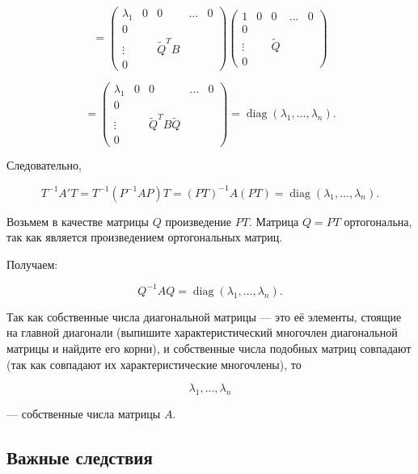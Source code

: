 {\[
= \begin{pmatrix}
\lambda_1 & 0 & 0 & \dots & 0 \\
0 & \\
\vdots & & \tilde{Q}^T B \\
0 &
\end{pmatrix}
\begin{pmatrix}
1 & 0 & 0 & \dots & 0 \\
0 & \\
\vdots & & \tilde{Q} \\
0 &
\end{pmatrix}
\]





\[
= \begin{pmatrix}
\lambda_1 & 0 & 0 & \dots & 0 \\
0 & \\
\vdots & & \tilde{Q}^T B \tilde{Q} \\
0 &
\end{pmatrix} = \operatorname{diag}(\lambda_1, \dots, \lambda_n).
\]

Следовательно,



\[
T^{-1} A' T = T^{-1} (P^{-1} A P) T = (P T)^{-1} A (P T) = \operatorname{diag}(\lambda_1, \dots, \lambda_n).
\]



Возьмем в качестве матрицы \( Q \) произведение \( P T \). Матрица \( Q = P T \) ортогональна, так как является произведением ортогональных матриц.

Получаем:



\[
Q^{-1} A Q = \operatorname{diag}(\lambda_1, \dots, \lambda_n).
\]



Так как собственные числа диагональной матрицы — это её элементы, стоящие на главной диагонали (выпишите характеристический многочлен диагональной матрицы и найдите его корни), и собственные числа подобных матриц совпадают (так как совпадают их характеристические многочлены), то



\[
\lambda_1, \dots, \lambda_n
\]



— собственные числа матрицы \( A \).


\subsection*{Важные следствия}

}
